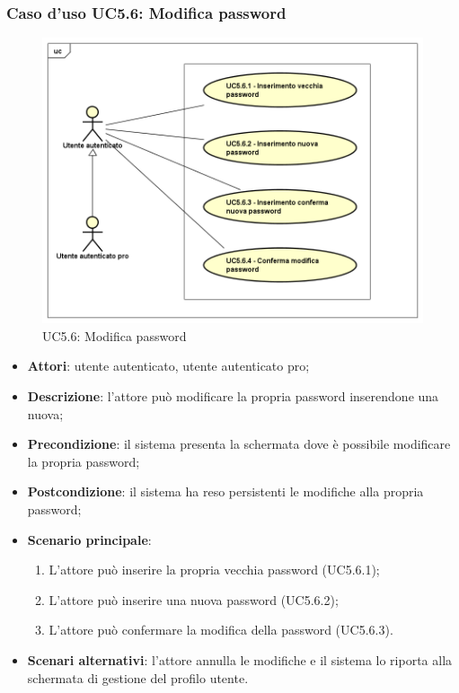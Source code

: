 \subsubsection{Caso d'uso UC5.6: Modifica password}
\label{UC5.6}
\begin{figure}[h]
	\centering
	\includegraphics[scale=0.5,keepaspectratio]{UML/UC5_6.png}
	\caption{UC5.6: Modifica password}
\end{figure}

\begin{itemize}
	\item \textbf{Attori}: utente autenticato, utente autenticato pro;
	\item \textbf{Descrizione}: l'attore può modificare la propria password inserendone una nuova;
	\item \textbf{Precondizione}: il sistema presenta la schermata dove è possibile modificare la propria password;
	\item \textbf{Postcondizione}: il sistema ha reso persistenti le modifiche alla propria password;
	\item \textbf{Scenario principale}:
	\begin{enumerate}
		\item L'attore può inserire la propria vecchia password (UC5.6.1);
		\item L'attore può inserire una nuova password (UC5.6.2);
		\item L'attore può confermare la modifica della password (UC5.6.3).
	\end{enumerate}
	\item \textbf{Scenari alternativi}: l'attore annulla le modifiche e il sistema lo riporta alla schermata di gestione del profilo utente.
\end{itemize}

